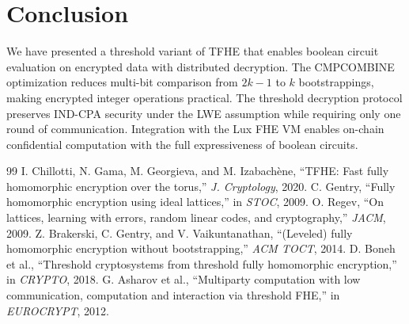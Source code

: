\documentclass[11pt,a4paper]{article}
\begin{document}
\section{Conclusion}
\label{sec:conclusion}

We have presented a threshold variant of TFHE that enables boolean circuit evaluation
on encrypted data with distributed decryption. The CMPCOMBINE optimization reduces
multi-bit comparison from $2k-1$ to $k$ bootstrappings, making encrypted integer
operations practical. The threshold decryption protocol preserves IND-CPA security
under the LWE assumption while requiring only one round of communication. Integration
with the Lux FHE VM enables on-chain confidential computation with the full
expressiveness of boolean circuits.

\begin{thebibliography}{99}
 I. Chillotti, N. Gama, M. Georgieva, and M. Izabach\`ene, ``TFHE: Fast fully homomorphic encryption over the torus,'' \emph{J. Cryptology}, 2020.
 C. Gentry, ``Fully homomorphic encryption using ideal lattices,'' in \emph{STOC}, 2009.
 O. Regev, ``On lattices, learning with errors, random linear codes, and cryptography,'' \emph{JACM}, 2009.
 Z. Brakerski, C. Gentry, and V. Vaikuntanathan, ``(Leveled) fully homomorphic encryption without bootstrapping,'' \emph{ACM TOCT}, 2014.
 D. Boneh et al., ``Threshold cryptosystems from threshold fully homomorphic encryption,'' in \emph{CRYPTO}, 2018.
 G. Asharov et al., ``Multiparty computation with low communication, computation and interaction via threshold FHE,'' in \emph{EUROCRYPT}, 2012.
\end{thebibliography}
\end{document}
